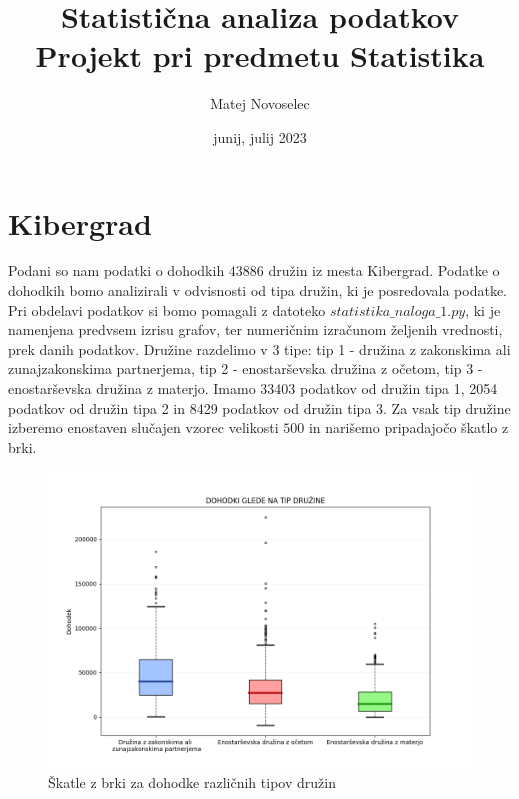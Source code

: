 \documentclass{article}
\begin{document}
\title{Statistična analiza podatkov\\
    \large Projekt pri predmetu Statistika
}
\author{
    Matej Novoselec\\
}
\date{junij, julij 2023}

\maketitle
\pagebreak

\section{Kibergrad}
Podani so nam podatki o dohodkih $43886$ družin iz mesta Kibergrad. Podatke o dohodkih bomo analizirali v odvisnosti od tipa družin, ki je posredovala podatke. 
Pri obdelavi podatkov si bomo pomagali z datoteko $statistika\_naloga\_1.py$, ki je namenjena predvsem izrisu grafov, ter numeričnim izračunom željenih vrednosti, prek danih podatkov. 
\newline
Družine razdelimo v $3$ tipe: tip 1 - družina z zakonskima ali zunajzakonskima partnerjema, tip 2 - enostarševska družina z očetom, tip 3 - enostarševska družina z materjo.
Imamo 33403 podatkov od družin tipa 1, 2054 podatkov od družin tipa 2 in 8429 podatkov od družin tipa 3.
Za vsak tip družine izberemo enostaven slučajen vzorec velikosti $500$ in narišemo pripadajočo škatlo z brki.

\begin{figure}[H]
    \begin{center}
    \includegraphics[width=\linewidth]{naloga1a.png}
    \vspace*{-10mm}\caption{Škatle z brki za dohodke različnih tipov družin}
    \end{center}    
\end{figure}
\end{document}
